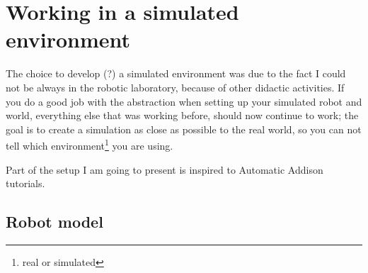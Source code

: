 \chapter{Working in a simulated environment}

The choice to develop (?) a simulated environment was due to the fact I could not be always in the robotic laboratory, because of other didactic activities. If you do a good job with the abstraction when setting up your simulated robot and world, everything else that was working before, should now continue to work; the goal is to create a simulation as close as possible to the real world, so you can not tell which environment\footnote{real or simulated} you are using.

Part of the setup I am going to present is inspired to Automatic Addison tutorials\cite{tutorials}.

\section{Robot model}